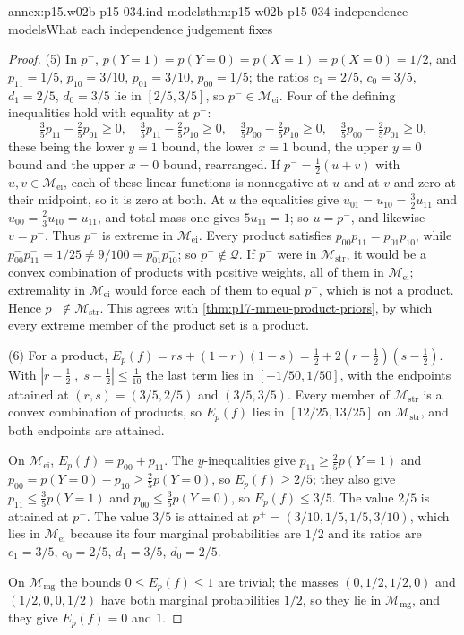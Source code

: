 \begin{annexitem}{annex:p15.w02b-p15-034.ind-models}{thm:p15-w02b-p15-034-independence-models}{What each independence judgement fixes}
\begin{proof}
(5) In \(p^-\), \(p(Y{=}1)=p(Y{=}0)=p(X{=}1)=p(X{=}0)=1/2\), and
\(p_{11}=1/5\), \(p_{10}=3/10\), \(p_{01}=3/10\), \(p_{00}=1/5\); the
ratios \(c_1=2/5\), \(c_0=3/5\), \(d_1=2/5\), \(d_0=3/5\) lie in
\([2/5,3/5]\), so \(p^-\in\mathcal M_{\mathrm{ei}}\). Four of the defining
inequalities hold with equality at \(p^-\):
\[
 \tfrac35p_{11}-\tfrac25p_{01}\geq0,\quad
 \tfrac35p_{11}-\tfrac25p_{10}\geq0,\quad
 \tfrac35p_{00}-\tfrac25p_{10}\geq0,\quad
 \tfrac35p_{00}-\tfrac25p_{01}\geq0,
\]
these being the lower \(y=1\) bound, the lower \(x=1\) bound, the upper
\(y=0\) bound and the upper \(x=0\) bound, rearranged. If
\(p^-=\tfrac12(u+v)\) with \(u,v\in\mathcal M_{\mathrm{ei}}\), each of
these linear functions is nonnegative at \(u\) and at \(v\) and zero at
their midpoint, so it is zero at both. At \(u\) the equalities give
\(u_{01}=u_{10}=\tfrac32u_{11}\) and \(u_{00}=\tfrac23u_{10}=u_{11}\), and
total mass one gives \(5u_{11}=1\); so \(u=p^-\), and likewise \(v=p^-\).
Thus \(p^-\) is extreme in \(\mathcal M_{\mathrm{ei}}\). Every product
satisfies \(p_{00}p_{11}=p_{01}p_{10}\), while
\(p^-_{00}p^-_{11}=1/25\ne9/100=p^-_{01}p^-_{10}\); so \(p^-\notin\mathcal Q\).
If \(p^-\) were in \(\mathcal M_{\mathrm{str}}\), it would be a convex
combination of products with positive weights, all of them in
\(\mathcal M_{\mathrm{ei}}\); extremality in \(\mathcal M_{\mathrm{ei}}\)
would force each of them to equal \(p^-\), which is not a product. Hence
\(p^-\notin\mathcal M_{\mathrm{str}}\). This agrees with
\cref{thm:p17-mmeu-product-priors}, by which every extreme member of the
product set is a product.

(6) For a product, \(E_p(f)=rs+(1-r)(1-s)=\tfrac12+2(r-\tfrac12)(s-\tfrac12)\).
With \(|r-\tfrac12|,|s-\tfrac12|\leq\tfrac1{10}\) the last term lies in
\([-1/50,1/50]\), with the endpoints attained at \((r,s)=(3/5,2/5)\) and
\((3/5,3/5)\). Every member of \(\mathcal M_{\mathrm{str}}\) is a convex
combination of products, so \(E_p(f)\) lies in \([12/25,13/25]\) on
\(\mathcal M_{\mathrm{str}}\), and both endpoints are attained.

On \(\mathcal M_{\mathrm{ei}}\), \(E_p(f)=p_{00}+p_{11}\). The
\(y\)-inequalities give \(p_{11}\geq\tfrac25p(Y{=}1)\) and
\(p_{00}=p(Y{=}0)-p_{10}\geq\tfrac25p(Y{=}0)\), so \(E_p(f)\geq2/5\); they
also give \(p_{11}\leq\tfrac35p(Y{=}1)\) and \(p_{00}\leq\tfrac35p(Y{=}0)\),
so \(E_p(f)\leq3/5\). The value \(2/5\) is attained at \(p^-\). The value
\(3/5\) is attained at \(p^+=(3/10,1/5,1/5,3/10)\), which lies in
\(\mathcal M_{\mathrm{ei}}\) because its four marginal probabilities are
\(1/2\) and its ratios are \(c_1=3/5\), \(c_0=2/5\), \(d_1=3/5\),
\(d_0=2/5\).

On \(\mathcal M_{\mathrm{mg}}\) the bounds \(0\leq E_p(f)\leq1\) are
trivial; the
masses \((0,1/2,1/2,0)\) and \((1/2,0,0,1/2)\) have both marginal
probabilities \(1/2\), so they lie in \(\mathcal M_{\mathrm{mg}}\), and
they give \(E_p(f)=0\) and \(1\).
\end{proof}
\end{annexitem}

